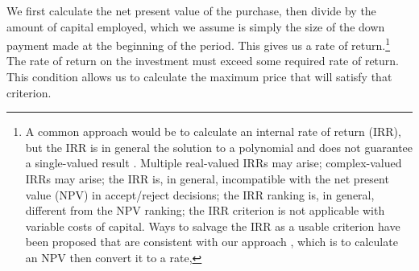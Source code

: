 We first calculate the net present value of the purchase, then divide by the amount of capital employed, which we assume is simply the size of the down payment made at the beginning of the period. This gives us a rate of return.\footnote{A common approach would be to calculate an internal rate of return (IRR), but  the IRR is in general the solution to a polynomial and does not guarantee a single-valued result \cite{robinsonOptimalTerminationIRR1996}. Multiple real-valued  IRRs may arise;  complex-valued IRRs may arise;  the IRR is, in general, incompatible with the net present value (NPV) in accept/reject decisions; the IRR ranking is, in general, different from the NPV ranking; the IRR criterion is not applicable with variable costs of capital. Ways to salvage the IRR as a usable criterion have been proposed that are consistent with our approach \cite{magniAverageInternalRate2010}, which is to calculate an NPV then convert it to a rate,} 
The rate of return on the investment must exceed some required rate of return. This condition allows us to calculate the maximum price that will satisfy that criterion.











